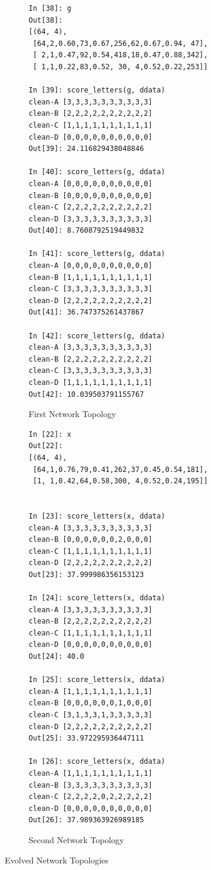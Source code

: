 \documentclass[12pt,a4paper]{article}
\begin{document}
\begin{figure}[H]
\label{fig:letter}
\begin{subfigure}[b]{.5\linewidth}
\centering
\begin{lstlisting}[basicstyle=\scriptsize\ttfamily]
In [38]: g
Out[38]:
[(64, 4),
 [64,2,0.60,73,0.67,256,62,0.67,0.94, 47],
 [ 2,1,0.47,92,0.54,418,18,0.47,0.88,342],
 [ 1,1,0.22,83,0.52, 30, 4,0.52,0.22,253]]

In [39]: score_letters(g, ddata)
clean-A [3,3,3,3,3,3,3,3,3,3]
clean-B [2,2,2,2,2,2,2,2,2,2]
clean-C [1,1,1,1,1,1,1,1,1,1]
clean-D [0,0,0,0,0,0,0,0,0,0]
Out[39]: 24.116829438048846

In [40]: score_letters(g, ddata)
clean-A [0,0,0,0,0,0,0,0,0,0]
clean-B [0,0,0,0,0,0,0,0,0,0]
clean-C [2,2,2,2,2,2,2,2,2,2]
clean-D [3,3,3,3,3,3,3,3,3,3]
Out[40]: 8.7608792519449832

In [41]: score_letters(g, ddata)
clean-A [0,0,0,0,0,0,0,0,0,0]
clean-B [1,1,1,1,1,1,1,1,1,1]
clean-C [3,3,3,3,3,3,3,3,3,3]
clean-D [2,2,2,2,2,2,2,2,2,2]
Out[41]: 36.747375261437867

In [42]: score_letters(g, ddata)
clean-A [3,3,3,3,3,3,3,3,3,3]
clean-B [2,2,2,2,2,2,2,2,2,2]
clean-C [3,3,3,3,3,3,3,3,3,3]
clean-D [1,1,1,1,1,1,1,1,1,1]
Out[42]: 10.039503791155767
\end{lstlisting}
\caption{First Network Topology}
\end{subfigure}
\begin{subfigure}[b]{.5\linewidth}
\centering
\begin{lstlisting}[basicstyle=\scriptsize\ttfamily]
In [22]: x
Out[22]:
[(64, 4),
 [64,1,0.76,79,0.41,262,37,0.45,0.54,181],
 [1, 1,0.42,64,0.58,300, 4,0.52,0.24,195]]
 

In [23]: score_letters(x, ddata)
clean-A [3,3,3,3,3,3,3,3,3,3]
clean-B [0,0,0,0,0,0,2,0,0,0]
clean-C [1,1,1,1,1,1,1,1,1,1]
clean-D [2,2,2,2,2,2,2,2,2,2]
Out[23]: 37.999986356153123

In [24]: score_letters(x, ddata)
clean-A [3,3,3,3,3,3,3,3,3,3]
clean-B [2,2,2,2,2,2,2,2,2,2]
clean-C [1,1,1,1,1,1,1,1,1,1]
clean-D [0,0,0,0,0,0,0,0,0,0]
Out[24]: 40.0

In [25]: score_letters(x, ddata)
clean-A [1,1,1,1,1,1,1,1,1,1]
clean-B [0,0,0,0,0,0,1,0,0,0]
clean-C [3,1,3,3,1,3,3,3,3,3]
clean-D [2,2,2,2,2,2,2,2,2,2]
Out[25]: 33.972295936447111

In [26]: score_letters(x, ddata)
clean-A [1,1,1,1,1,1,1,1,1,1]
clean-B [3,3,3,3,3,3,3,3,3,3]
clean-C [2,2,2,2,0,2,2,2,2,2]
clean-D [0,0,0,0,0,0,0,0,0,0]
Out[26]: 37.989363926989185
\end{lstlisting}
\caption{Second Network Topology}

\end{subfigure}
\caption{Evolved Network Topologies}
\end{figure}
\end{document}
